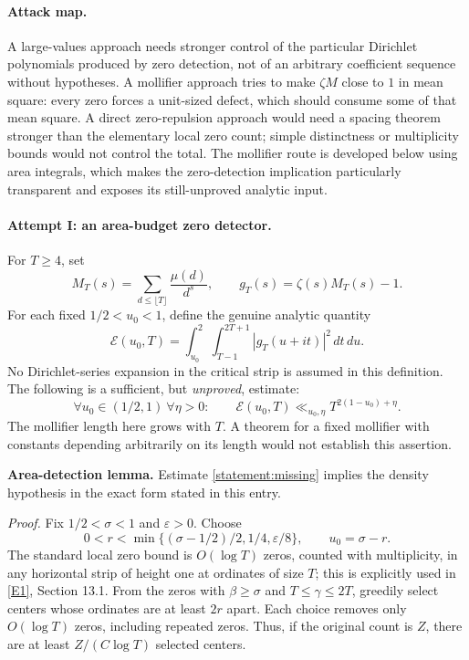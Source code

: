 \documentclass[11pt,a4paper]{article}
\newcommand{\eref}[2]{\hyperlink{extra:#1:#2}{[E#2]}}
\numberwithin{equation}{section}
\begin{document}
\paragraph{Attack map.}
A large-values approach needs stronger control of the particular
Dirichlet polynomials produced by zero detection, not of an arbitrary
coefficient sequence without hypotheses.  A mollifier approach tries
to make $\zeta M$ close to $1$ in mean square: every zero forces a
unit-sized defect, which should consume some of that mean square.
A direct zero-repulsion approach would need a spacing theorem stronger
than the elementary local zero count; simple distinctness or multiplicity
bounds would not control the total.  The mollifier route is developed
below using area integrals, which makes the zero-detection implication
particularly transparent and exposes its still-unproved analytic input.

\paragraph{Attempt I: an area-budget zero detector.}
For $T\geq4$, set
\[
 M_T(s)=\sum_{d\leq\lfloor T\rfloor}\frac{\mu(d)}{d^s},\qquad
 g_T(s)=\zeta(s)M_T(s)-1.
\]
For each fixed $1/2<u_0<1$, define the genuine analytic quantity
\begin{equation}\label{statement:area}
 \mathcal E(u_0,T)=\int_{u_0}^{2}\int_{T-1}^{2T+1}
                       |g_T(u+it)|^2\,dt\,du.
\end{equation}
No Dirichlet-series expansion in the critical strip is assumed in this
definition.  The following is a sufficient, but \emph{unproved}, estimate:
\begin{equation}\label{statement:missing}
 \forall u_0\in(1/2,1)\ \forall\eta>0:\qquad
 \mathcal E(u_0,T)\ll_{u_0,\eta}T^{2(1-u_0)+\eta}.
\end{equation}
The mollifier length here grows with $T$.  A theorem for a fixed
mollifier with constants depending arbitrarily on its length would not
establish this assertion.

\textbf{Area-detection lemma.}
Estimate \eqref{statement:missing} implies the density hypothesis in the exact
form stated in this entry.

\emph{Proof.} Fix $1/2<\sigma<1$ and $\varepsilon>0$.  Choose
\[
 0<r<\min\{(\sigma-1/2)/2,1/4,\varepsilon/8\},\qquad u_0=\sigma-r.
\]
The standard local zero bound is $O(\log T)$ zeros, counted with
multiplicity, in any horizontal strip of height one at ordinates of
size $T$; this is explicitly used in \eref{statement}{1}, Section 13.1.
From the zeros with $\beta\geq\sigma$ and $T\leq\gamma\leq2T$,
greedily select centers whose ordinates are at least $2r$ apart.
Each choice removes only $O(\log T)$ zeros, including repeated zeros.
Thus, if the original count is $Z$, there are at least
$Z/(C\log T)$ selected centers.
\end{document}
